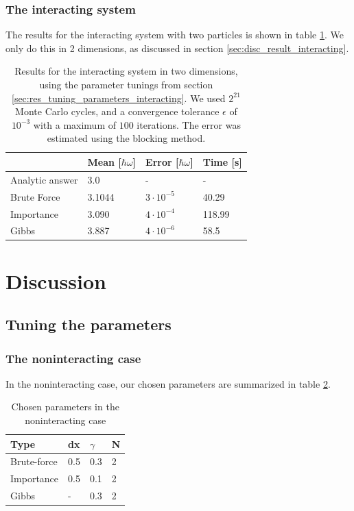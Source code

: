 \documentclass[a4paper, 10pt]{article}
\begin{document}
\subsubsection{The interacting system}
The results for the interacting system with two particles is shown in table \ref{tab:interacting_results}. We only do this in 2 dimensions, as discussed in section \ref{sec:disc_result_interacting}.
\begin{table}[ht!]
	\centering
	\caption{Results for the interacting system in two dimensions, using the parameter tunings from section \ref{sec:res_tuning_parameters_interacting}. We used $2^{21}$ Monte Carlo cycles, and a convergence tolerance $\epsilon$ of $10^{-3}$ with a maximum of $100$ iterations. The error was estimated using the blocking method.}
	\label{tab:interacting_results}
	\begin{tabular}{l|l|l|l|}
		& Mean [$\hbar \omega$] & Error [$\hbar \omega$]                         & Time [s] \\
		\hline
		Analytic answer & 3.0 &- &-\\
		Brute Force & 3.1044                    & $3\cdot 10^{-5}$                                   & 40.29        \\
		Importance  & 3.090                     & $4\cdot 10^{-4}$                                   & 118.99       \\
		Gibbs       & 3.887                     & $4\cdot 10^{-6}$				 & 58.5        
	\end{tabular}
\end{table}
\clearpage
\section{Discussion}
\subsection{Tuning the parameters}
\subsubsection{The noninteracting case}\label{sec:tuning_parameters_noninteracting}
In the noninteracting case, our chosen parameters are summarized in table \ref{tab:chosen_parameters_noninteracting}.
\begin{table}[ht!]
	\centering
	\caption{Chosen parameters in the noninteracting case}
	\label{tab:chosen_parameters_noninteracting}
	\begin{tabular}{llll}
		Type        & dx  & $\gamma$ & N \\
		\hline
		Brute-force & 0.5 & 0.3      & 2 \\
		Importance  & 0.5 & 0.1      & 2 \\
		Gibbs       & -   & 0.3      & 2
	\end{tabular}
\end{table}
\end{document}
